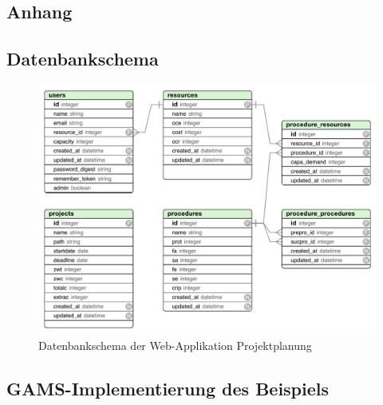 \documentclass[a4paper,12pt,parskip,bibtotoc,liststotoc]{article}
\begin{document}
\newpage
%
%
\begin{appendix}
\section{Anhang}

\subsection{Datenbankschema}\label{db-schema}

\begin{figure}[h!]
  \begin{center}
    \includegraphics[width=150mm]{Bilder/DB.pdf}
    \caption{Datenbankschema der Web-Applikation Projektplanung}  \label{schema}
  \end{center}
\end{figure}

\subsection{GAMS-Implementierung des Beispiels}\label{Imp}
%






\end{appendix}
\end{document}
